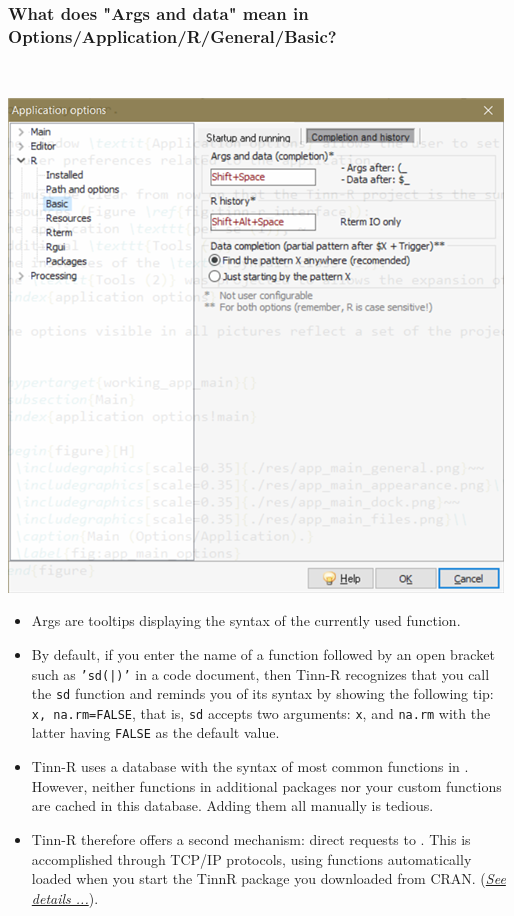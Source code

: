 \subsubsection{What does "Args and data" mean in Options/Application/R/General/Basic?}\\

\includegraphics[scale=1]{./res/app_r_basic_completion_history.png}

\begin{itemize}
  \item Args are tooltips displaying the syntax of the currently used
    \RR{} function.
  \item By default, if you enter the name of a function followed by an open
    bracket such as \texttt{'sd(|)'} in a \RR{} code document, then Tinn-R recognizes
    that you call the \texttt{sd} \RR{} function and reminds you of its syntax
    by showing the following tip: \texttt{x, na.rm=FALSE}, that is, \texttt{sd}
    accepts two arguments: \texttt{x}, and \texttt{na.rm} with the latter
    having \texttt{FALSE} as the default value.
  \item Tinn-R uses a database with the syntax of most common functions in \RR{}.
    However, neither functions in additional packages nor your custom
    functions are cached in this database.  Adding them all manually is
    tedious.
  \item Tinn-R therefore offers a second mechanism: direct requests to \RR{}. This
    is accomplished through TCP/IP protocols, using functions
    automatically loaded when you start the TinnR package you downloaded
    from CRAN.
    (\textit{\href{\#basic\_configuration}{See details ...}}).
\end{itemize}

